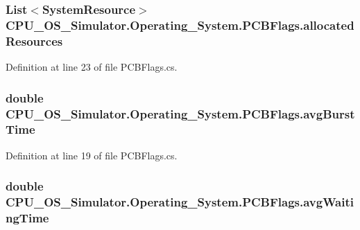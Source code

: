 \subsubsection[{allocated\+Resources}]{\setlength{\rightskip}{0pt plus 5cm}List$<${\bf System\+Resource}$>$ C\+P\+U\+\_\+\+O\+S\+\_\+\+Simulator.\+Operating\+\_\+\+System.\+P\+C\+B\+Flags.\+allocated\+Resources}\label{struct_c_p_u___o_s___simulator_1_1_operating___system_1_1_p_c_b_flags_a204cecda661767e690738e40b127a8f0}


Definition at line 23 of file P\+C\+B\+Flags.\+cs.

\hypertarget{struct_c_p_u___o_s___simulator_1_1_operating___system_1_1_p_c_b_flags_a1c7b8ae576214d5e26c37727b15b8833}{}
\subsubsection[{avg\+Burst\+Time}]{\setlength{\rightskip}{0pt plus 5cm}double C\+P\+U\+\_\+\+O\+S\+\_\+\+Simulator.\+Operating\+\_\+\+System.\+P\+C\+B\+Flags.\+avg\+Burst\+Time}\label{struct_c_p_u___o_s___simulator_1_1_operating___system_1_1_p_c_b_flags_a1c7b8ae576214d5e26c37727b15b8833}


Definition at line 19 of file P\+C\+B\+Flags.\+cs.

\hypertarget{struct_c_p_u___o_s___simulator_1_1_operating___system_1_1_p_c_b_flags_ae6d30d555620b4fe5a92baea4ad933d1}{}
\subsubsection[{avg\+Waiting\+Time}]{\setlength{\rightskip}{0pt plus 5cm}double C\+P\+U\+\_\+\+O\+S\+\_\+\+Simulator.\+Operating\+\_\+\+System.\+P\+C\+B\+Flags.\+avg\+Waiting\+Time}\label{struct_c_p_u___o_s___simulator_1_1_operating___system_1_1_p_c_b_flags_ae6d30d555620b4fe5a92baea4ad933d1}


